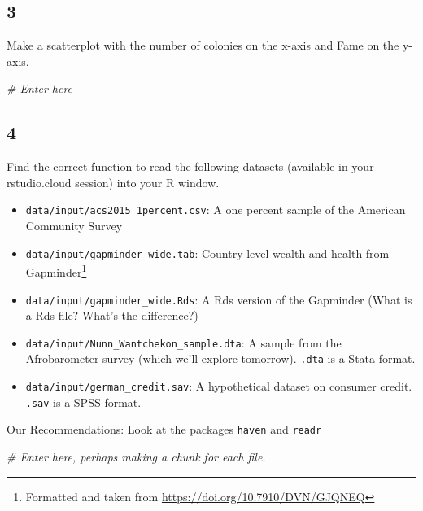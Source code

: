 \documentclass[]{book}
\newenvironment{Shaded}{\begin{snugshade}}{\end{snugshade}}
\newcommand{\CommentTok}[1]{\textcolor[rgb]{0.56,0.35,0.01}{\textit{#1}}}
\providecommand{\tightlist}{%
  \setlength{\itemsep}{0pt}\setlength{\parskip}{0pt}}
\let\rmarkdownfootnote\footnote%
\def\footnote{\protect\rmarkdownfootnote}
\theoremstyle{definition}
\theoremstyle{definition}
\theoremstyle{definition}
\theoremstyle{remark}
\begin{document}
\subsection*{3}\label{section-2}

Make a scatterplot with the number of colonies on the x-axis and Fame on
the y-axis.

\begin{Shaded}
\begin{Highlighting}[]
\CommentTok{# Enter here}
\end{Highlighting}
\end{Shaded}

\subsection*{4}\label{section-3}

Find the correct function to read the following datasets (available in
your rstudio.cloud session) into your R window.

\begin{itemize}
\tightlist
\item
  \texttt{data/input/acs2015\_1percent.csv}: A one percent sample of the
  American Community Survey
\item
  \texttt{data/input/gapminder\_wide.tab}: Country-level wealth and
  health from Gapminder\footnote{Formatted and taken from
    \url{https://doi.org/10.7910/DVN/GJQNEQ}}
\item
  \texttt{data/input/gapminder\_wide.Rds}: A Rds version of the
  Gapminder (What is a Rds file? What's the difference?)
\item
  \texttt{data/input/Nunn\_Wantchekon\_sample.dta}: A sample from the
  Afrobarometer survey (which we'll explore tomorrow). \texttt{.dta} is
  a Stata format.
\item
  \texttt{data/input/german\_credit.sav}: A hypothetical dataset on
  consumer credit. \texttt{.sav} is a SPSS format.
\end{itemize}

Our Recommendations: Look at the packages \texttt{haven} and
\texttt{readr}

\begin{Shaded}
\begin{Highlighting}[]
\CommentTok{# Enter here, perhaps making a chunk for each file.}
\end{Highlighting}
\end{Shaded}
\end{document}
